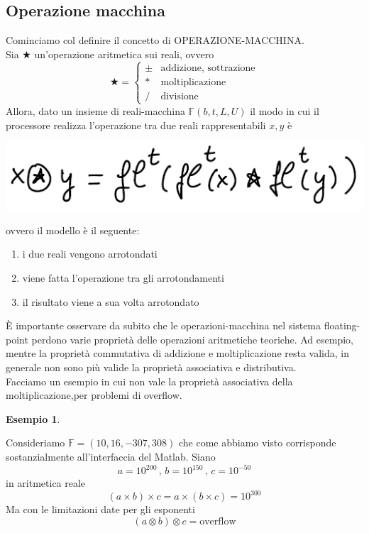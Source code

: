 \documentclass[12pt]{article}
\newtheorem*{esempio}{Esempio}
\begin{document}
\subsection{Operazione macchina}
Cominciamo col definire il concetto di OPERAZIONE-MACCHINA.\\
Sia $\bigstar$ un’operazione aritmetica sui reali, ovvero \[ \bigstar =
\begin{cases}
    \pm & \text{addizione, sottrazione} \\
    * & \text{moltiplicazione} \\
    / & \text{divisione}
\end{cases}
\]
Allora, dato un insieme di reali-macchina $\mathbb{F}(b, t, L, U)$ il modo in cui il processore realizza l’operazione tra due reali rappresentabili $x, y$ è 
\begin{center}
    \includegraphics[scale=0.65]{img11.png}
\end{center}
ovvero il modello è il seguente:
\begin{enumerate}
    \item i due reali vengono arrotondati
    \item viene fatta l’operazione tra gli arrotondamenti
    \item il risultato viene a sua volta arrotondato
\end{enumerate}
È importante osservare da subito che le operazioni-macchina nel sistema floating-point perdono varie proprietà delle operazioni aritmetiche teoriche. Ad esempio, mentre la proprietà commutativa di addizione e moltiplicazione resta valida, in generale non sono più valide la proprietà associativa e distributiva.\\
Facciamo un esempio in cui non vale la proprietà associativa della moltiplicazione,per problemi di overflow.
\begin{esempio} \end{esempio}
Consideriamo $\mathbb{F} = (10, 16, -307, 308)$ che come abbiamo visto corrisponde sostanzialmente all'interfaccia del Matlab. Siano
\[ a = 10^{200}\,,\,b = 10^{150}\,,\,c = 10^{-50} \]
in aritmetica reale \[ (a \times b) \times c = a \times (b \times c) = 10^{300} \]
Ma con le limitazioni date per gli esponenti \[(a \otimes b) \otimes c = \text{overflow}\]
\end{document}
